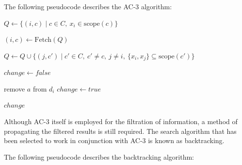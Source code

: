 \documentclass{report}
\begin{document}
The following pseudocode describes the AC-3 algorithm:

\vspace{1\baselineskip}

\begin{algorithmic}


    \State $Q \leftarrow \{(i,c)\mid c \in C,\ x_i \in \text{scope}(c)\}$


        \State $(i,c) \leftarrow \text{Fetch}(Q)$


            \State $Q \leftarrow Q \cup \{(j,c') \mid c' \in C,\ c' \neq c,\ j \neq i,\ \{x_i,x_j\} \subseteq \text{scope}(c')\}$

        \EndIf

    \EndWhile

\EndProcedure

\end{algorithmic}

\vspace{1\baselineskip}

\begin{algorithmic}


    \State $change \leftarrow false$


            
            \State remove $a$ from $d_i$
            \State $change \leftarrow true$

        \EndIf

    \EndFor

    \State \Return $change$

\EndFunction

\end{algorithmic}


Although AC-3 itself is employed for the filtration of information, a method of propagating the filtered results is still required. The search algorithm that has been selected to work in conjunction with AC-3 is known as backtracking.

The following pseudocode describes the backtracking algorithm:
\end{document}
